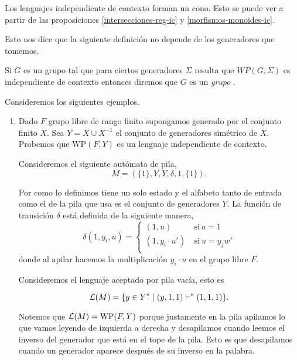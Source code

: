 \documentclass[tesis.tex]{subfiles}
\begin{document}
\begin{ej}\label{ic-cono}
	Los lenguajes independiente de contexto forman un cono.
	Esto se puede ver a partir de las proposiciones  \ref{intersecciones-reg-ic} y \ref{morfismos-monoides-ic}.
\end{ej}

Esto nos dice que la siguiente definición no depende de los generadores que tomemos.

\begin{deff}
	Si $G$ es un grupo \fg tal que para ciertos generadores $\Sigma$ resulta que $WP(G, \Sigma)$ es independiente de contexto entonces diremos que $G$ es un \emph{grupo \ic }.
\end{deff}


\begin{ej} Consideremos los siguientes ejemplos.	
	\begin{enumerate}[E1.]
		\item 
		Dado $F$ grupo libre de rango finito supongamos generado por el conjunto finito $X$. 
		Sea  $Y = X \cup X^{-1}$ el conjunto de generadores simétrico de $X$. 
		Probemos que $\text{WP}(F,Y)$ es un lenguaje independiente de contexto.
		
		Consideremos el siguiente autómata de pila,
		\[
		M = (\{ 1 \}, Y, Y, \delta, 1, \{1\}).
		\]
		
		Por como lo definimos tiene un solo estado y el alfabeto tanto de entrada como el de la pila que usa es el conjunto de generadores $Y$.
		La función de transición $\delta$ está definida de la siguiente manera,
		\[
		\delta(1, y_i, u)=\left\{
		\begin{array}{ll}
		(1 , u )  &\ \text{si} \ a = 1  \\
		(1, y_i \cdot u') &\ \text{si} \  u = y_jw'  \\
		\end{array}
		\right.
		\]
		donde al apilar hacemos la multiplicación $y_i \cdot u$ en el grupo libre $F$.
		
		Consideremos el lenguaje aceptado por pila vacía, esto es
		
		\[
		{\cal L }(M) = \{  y \in Y^* \mid (y,1,1)   \vdash^*  (1, 1, 1)  \}.
		\]
		
		Notemos que ${\cal L }(M) = \text{WP}(F,Y)$ porque justamente en la pila apilamos lo que vamos leyendo de izquierda a derecha y desapilamos cuando leemos el inverso del generador que está en el tope de la pila.
		Esto es que desapilamos cuando un generador aparece después de su inverso en la palabra.


\end{enumerate}
\end{ej}
\end{document}
